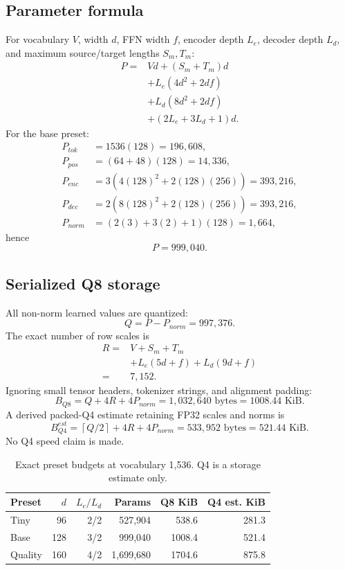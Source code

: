 \documentclass{article}
\begin{document}
\subsection{Parameter formula}
For vocabulary $V$, width $d$, FFN width $f$, encoder depth $L_e$, decoder depth $L_d$, and maximum source/target lengths $S_m,T_m$:
\begin{align}
P={}&Vd+(S_m+T_m)d\\
&+L_e(4d^2+2df)\\
&+L_d(8d^2+2df)\\
&+(2L_e+3L_d+1)d.
\label{eq:param}
\end{align}
For the base preset:
\begin{align}
P_{tok}&=1536(128)=196{,}608,\\
P_{pos}&=(64+48)(128)=14{,}336,\\
P_{enc}&=3(4(128)^2+2(128)(256))=393{,}216,\\
P_{dec}&=2(8(128)^2+2(128)(256))=393{,}216,\\
P_{norm}&=(2(3)+3(2)+1)(128)=1{,}664,
\end{align}
hence
\begin{equation}
P=999{,}040.
\end{equation}

\subsection{Serialized Q8 storage}
All non-norm learned values are quantized:
\begin{equation}
Q=P-P_{norm}=997{,}376.
\end{equation}
The exact number of row scales is
\begin{align}
R={}&V+S_m+T_m\\
&+L_e(5d+f)+L_d(9d+f)\\
={}&7{,}152.
\end{align}
Ignoring small tensor headers, tokenizer strings, and alignment padding:
\begin{equation}
B_{Q8}=Q+4R+4P_{norm}
=1{,}032{,}640\text{ bytes}
=1008.44\text{ KiB}.
\end{equation}
A derived packed-Q4 estimate retaining FP32 scales and norms is
\begin{equation}
B_{Q4}^{est}
=\left\lceil Q/2\right\rceil+4R+4P_{norm}
=533{,}952\text{ bytes}
=521.44\text{ KiB}.
\end{equation}
No Q4 speed claim is made.

\begin{table}[t]
\centering
\caption{Exact preset budgets at vocabulary 1,536. Q4 is a storage estimate only.}
\begin{tabular}{lrrrrr}
\toprule
Preset & $d$ & $L_e/L_d$ & Params & Q8 KiB & Q4 est. KiB\\
\midrule
Tiny & 96 & 2/2 & 527,904 & 538.6 & 281.3\\
Base & 128 & 3/2 & 999,040 & 1008.4 & 521.4\\
Quality & 160 & 4/2 & 1,699,680 & 1704.6 & 875.8\\
\bottomrule
\end{tabular}
\end{table}
\end{document}
